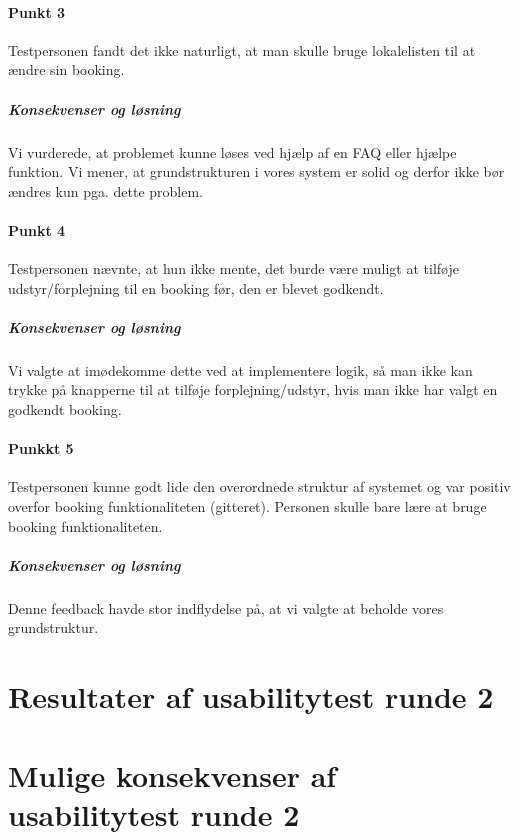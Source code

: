 \paragraph{Punkt 3}
Testpersonen fandt det ikke naturligt, at man skulle bruge lokalelisten til at ændre sin booking.
\subparagraph{Konsekvenser og løsning}
Vi vurderede, at problemet kunne løses ved hjælp af en FAQ eller hjælpe funktion. Vi mener, at grundstrukturen i vores system er solid og derfor ikke bør ændres kun pga. dette problem.

\paragraph{Punkt 4}
Testpersonen nævnte, at hun ikke mente, det burde være muligt at tilføje udstyr/forplejning til en booking før, den er blevet godkendt.
\subparagraph{Konsekvenser og løsning}
Vi valgte at imødekomme dette ved at implementere logik, så man ikke kan trykke på knapperne til at tilføje forplejning/udstyr, hvis man ikke har valgt en godkendt booking.

\paragraph{Punkkt 5}
Testpersonen kunne godt lide den overordnede struktur af systemet og var positiv overfor booking funktionaliteten (gitteret). Personen skulle bare lære at bruge booking funktionaliteten.
\subparagraph{Konsekvenser og løsning}
Denne feedback havde stor indflydelse på, at vi valgte at beholde vores grundstruktur.

\section{Resultater af usabilitytest runde 2}
\label{Usability_R2}
\section{Mulige konsekvenser af usabilitytest runde 2}
\label{Usability_R2_Possibilities}